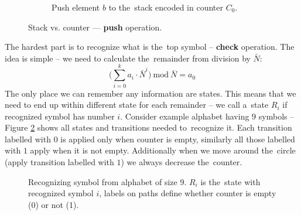 \documentclass[english,shortabstract,mgr]{iithesis}
\begin{document}
\begin{figure}[H]
\begin{subfigure}[b]{0.6\textwidth}
\begin{tikzpicture}[stack/.style={rectangle split, rectangle split parts=#1,draw, anchor=center}]
    \end{tikzpicture}

    \captionsetup{font=footnotesize}
    \caption{Push element $b$ to the~stack encoded in counter $C_0$.}

  \end{subfigure}

  \caption{Stack vs. counter --- \textbf{push} operation.}
  \label{fig:push_operation}

\end{figure}


The hardest part is to recognize what is the~top symbol -- \textbf{check} operation.
The idea is simple -- we need to calculate the~remainder from division by $\bar{N}$:
$$ \Bigg( \sum_{i=0}^{k} a_i \cdot \bar{N}^i \Bigg) \ \mathrm{mod} \ \bar{N} = a_0 $$
The only place we can remember any information are states. This means that we need
to end up within different state for each remainder -- we call a~state $R_i$ if
recognized symbol has number $i$. Consider example alphabet having $9$ symbols -- Figure
\ref{fig:check} shows all states and transitions needed to~recognize it. Each
transition labelled with $0$ is applied only when counter is empty, similarly
all those labelled with $1$ apply when it is not empty. Additionally when we move around
the~circle (apply transition labelled with $1$) we always decrease the~counter.

\begin{figure}[H]
\centering
{}

\caption{Recognizing symbol from alphabet of size $9$. $R_i$ is the~state with recognized
  symbol $i$, labels on paths define whether counter is empty (0) or not (1).}
\label{fig:check}

\end{figure}
\end{document}
